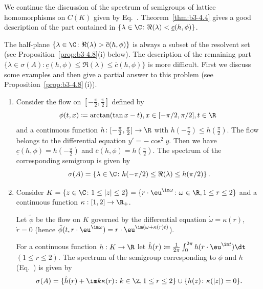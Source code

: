 We continue the discussion of the spectrum of semigroups of lattice homomorphisms on $C(K)$ given by Eq.~.
Theorem~\ref{thm:b3-4.4} gives a good description of the part contained in $\{\lambda \in \C \colon \Re(\lambda) < \underline{c}(h,\phi)\}$.

The half-plane $\{\lambda \in \C \colon \Re(\lambda) > \overline{c}(h,\phi)\}$ is always a subset of the resolvent set (see Proposition~\ref{prop:b3-4.8}(i) below).
The description of the remaining part $\{\lambda \in \sigma(A) \colon \underline{c}(h,\phi) \leq \Re(\lambda) \leq \overline{c}(h,\phi)\}$ is more difficult.
First we discuss some examples and then give a partial answer to this problem (see Proposition~\ref{prop:b3-4.8}\,(i)).

\begin{example}\label{ex:b3-4.7}
	\begin{enumerate}[\upshape (i), wide, labelindent=.25em]
		\item 
		Consider the flow on $[-\frac{\pi}{2},\frac{\pi}{2}]$ defined by
		\[
		\phi(t,x)\coloneq \arctan(\tan x - t) , x \in [-{\pi}/{2},{\pi}/{2}], 
		t \in \R\
		\] 
		and a continuous function $h \colon [-\frac{\pi}{2},\frac{\pi}{2}] \to \R$ with $h(-\frac{\pi}{2}) \leq h(\frac{\pi}{2})$. The flow belongs to the differential equation $y' = -\cos^2y$. 
		Then we have $\underline{c}(h,\phi) = h(-\frac{\pi}{2})$ and $\overline{c}(h,\phi) = h(\frac{\pi}{2})$.
		The spectrum of the corresponding semigroup is given by 
		\[
		\sigma(A) = \left\{\lambda \in \C \colon h(-\pi/2) \leq \Re(\lambda) \leq h(\pi/2)\right\}.
		\]
		
		\item 
		Consider $K = \{z \in \C \colon 1 \leq |z| \leq 2\} = \{r\cdot \eu^{\mathcal{\im\omega}} \colon \omega\in \R, 1 \leq r \leq 2\}$ and a continuous function $\kappa: [1,2] \to \R_+$.
		
		Let $\tilde{\phi}$ be the flow on $K$ governed by the differential equation $\dot{\omega} = \kappa(r)$, $\dot{r} = 0$ (hence $\tilde{\phi}(t,r\cdot \eu^{\im\omega}) = r\cdot \eu^{\im(\omega + \kappa(r)t)}$).
		
		For a continuous function $h: K \to \R$ let $\hat{h}(r) \coloneq \frac{1}{2\pi}\int_{0}^{2\pi} h(r\cdot \eu^{\im t}) \dt$ $(1 \leq r \leq 2)$.
		The spectrum of the semigroup corresponding to $\phi$ and $h$ (\cf Eq.~\myeqpageref{eq:b3-4.1}) is given by
		\[
		\sigma(A) = \{\hat{h}(r) +  \im k\kappa(r) \colon k \in \Z, 1 \leq r \leq 2\} \cup \{h(z) \colon \kappa(|z|) = 0\}.
		\]
	\end{enumerate}
\end{example}
